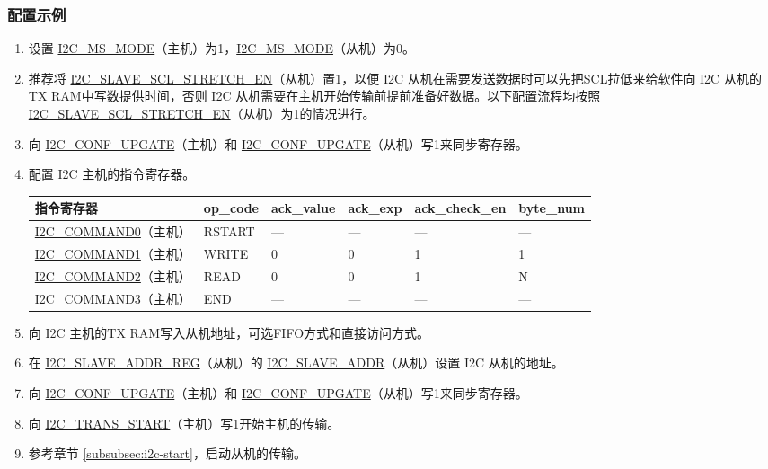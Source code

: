 \documentclass[main\_\_CN.tex]{subfiles}
\begin{document}
\subsubsection{配置示例}
\begin{enumerate}
\item 设置 \hyperref[fielddesc:I2CMSMODE]{I2C\_MS\_MODE}（主机）为1，\hyperref[fielddesc:I2CMSMODE]{I2C\_MS\_MODE}（从机）为0。
\item 推荐将 \hyperref[fielddesc:I2CSLAVESCLSTRETCHEN]{I2C\_SLAVE\_SCL\_STRETCH\_EN}（从机）置1，以便 I2C 从机在需要发送数据时可以先把SCL拉低来给软件向 I2C 从机的TX RAM中写数提供时间，否则 I2C 从机需要在主机开始传输前提前准备好数据。以下配置流程均按照 \hyperref[fielddesc:I2CSLAVESCLSTRETCHEN]{I2C\_SLAVE\_SCL\_STRETCH\_EN}（从机）为1的情况进行。 
\item 向 \hyperref[fielddesc:I2CCONFUPGATE]{I2C\_CONF\_UPGATE}（主机）和 \hyperref[fielddesc:I2CCONFUPGATE]{I2C\_CONF\_UPGATE}（从机）写1来同步寄存器。
\item 配置 I2C 主机的指令寄存器。
\begin{longtable}{ | p{4cm} | p{2cm} | p{2cm} | p{2cm} |p{2.2cm} | p{1.8cm} |}
\hline\rowcolor{lightgray}
指令寄存器& op\_code & ack\_value&ack\_exp&ack\_check\_en&byte\_num  \\ \hline
\hyperref[fielddesc:I2CCOMMAND0]{I2C\_COMMAND0}（主机）& RSTART& ---&---&---&---  \\ \hline
\hyperref[fielddesc:I2CCOMMAND1]{I2C\_COMMAND1}（主机）& WRITE& 0&0&1&1  \\ \hline
\hyperref[fielddesc:I2CCOMMAND2]{I2C\_COMMAND2}（主机）& READ& 0&0&1&N  \\ \hline
\hyperref[fielddesc:I2CCOMMAND3]{I2C\_COMMAND3}（主机）& END& ---&---&---&---  \\ \hline
\end{longtable}
\item 向 I2C 主机的TX RAM写入从机地址，可选FIFO方式和直接访问方式。
\item 在 \hyperref[regdesc:I2CSLAVEADDRREG]{I2C\_SLAVE\_ADDR\_REG}（从机）的 \hyperref[fielddesc:I2CSLAVEADDR]{I2C\_SLAVE\_ADDR}（从机）设置 I2C 从机的地址。
\item 向 \hyperref[fielddesc:I2CCONFUPGATE]{I2C\_CONF\_UPGATE}（主机）和 \hyperref[fielddesc:I2CCONFUPGATE]{I2C\_CONF\_UPGATE}（从机）写1来同步寄存器。
\item 向 \hyperref[fielddesc:I2CTRANSSTART]{I2C\_TRANS\_START}（主机）写1开始主机的传输。
\item 参考章节 \ref{subsubsec:i2c-start}，启动从机的传输。

\end{enumerate}
\end{document}
